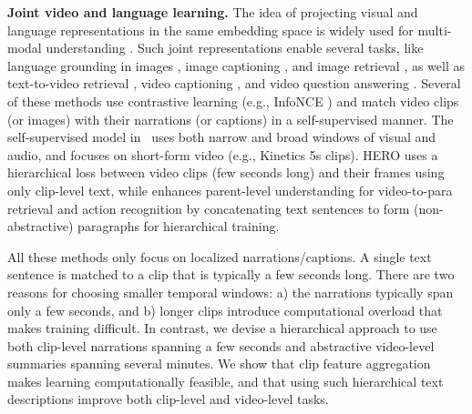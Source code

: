 \documentclass[10pt,twocolumn,letterpaper]{article}
\newcommand{\KAcamera}[1]{{\color{black}{}#1}}
\begin{document}
\textbf{Joint video and language learning.} The idea of projecting visual and language representations in the same embedding space is widely used for multi-modal understanding \cite{howto100m,mil-nce,frozenintime,egovlp,videoclip}.  Such joint representations enable several tasks, like language grounding in images \cite{img-grounding-1,img-grounding-2,img-grounding-3,img-grounding-4,img-grounding-5}, image captioning \cite{captioning-1,captioning-2,captioning-3,captioning-4,captioning-5}, and image retrieval \cite{img-retrieval-1,img-retrieval-2,img-retrieval-3,img-retrieval-4,img-retrieval-5}, as well as text-to-video retrieval \cite{vid-retrieval-1,vid-retrieval-2,vid-retrieval-3,videoclip,univl}, video captioning \cite{univl,coot,xu2021vlm,omnivl}, and video question answering \cite{vqa-1,hero,tvqa+,just-ask,vqa-2,naq}. Several of these methods \cite{howto100m,mil-nce,videoclip,egovlp,univl} use contrastive learning  (e.g., InfoNCE \cite{infonce}) and match video clips (or images) with their narrations (or captions) in a self-supervised manner. The self-supervised model in~\cite{brave} uses both narrow and broad windows of visual and audio, and focuses on short-form video (e.g., Kinetics 5s clips). \KAcamera{HERO \cite{hero} uses a hierarchical loss between video clips (few seconds long) and their frames using only clip-level text, while \cite{cmhse} enhances parent-level understanding for video-to-para retrieval and action recognition by concatenating text sentences to form (non-abstractive) paragraphs for hierarchical training.}







All these methods only focus on localized narrations/captions. A single text sentence is matched to a clip that is typically a few seconds long.
There are two reasons for choosing smaller temporal windows: a) the narrations typically span only a few seconds, and b) longer clips introduce computational overload that makes training difficult.  
In contrast, we devise a hierarchical 
approach to use both clip-level narrations spanning a few seconds and abstractive video-level summaries spanning several minutes. We show that clip feature aggregation  makes learning computationally feasible, and  that using such hierarchical text descriptions improve both clip-level and video-level tasks.



 
\end{document}
